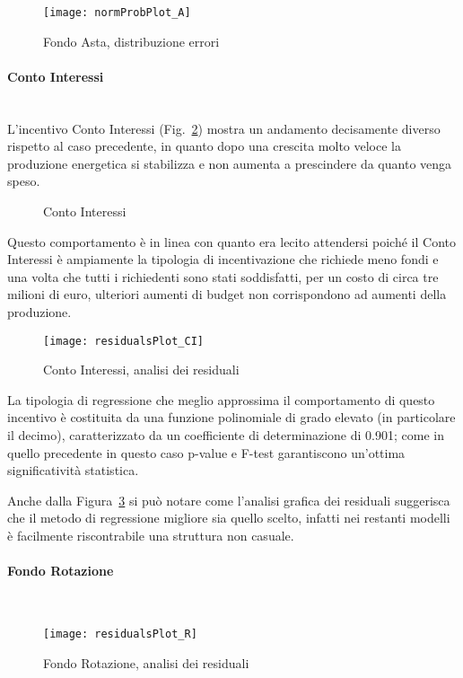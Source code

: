 \documentclass[12pt,a4paper,openright,twoside]{report}
\newcommand{\myparagraph}[1]{\paragraph{#1}\mbox{}\\}
\begin{document}
\begin{figure}[H]
	\centering
	\texttt{[image: normProbPlot\_A]}
	\caption{Fondo Asta, distribuzione errori}
	\label{normProbPlot_A}
\end{figure}

\myparagraph{Conto Interessi}

L'incentivo Conto Interessi (Fig.~\ref{graphSimCI}) mostra un andamento decisamente diverso rispetto al caso precedente, in quanto dopo una crescita molto veloce la produzione energetica si stabilizza e non aumenta a prescindere da quanto venga speso. 


\begin{figure}[H]
	\centering
	\qquad
	\caption{Conto Interessi}
	\label{graphSimCI}
\end{figure}

Questo comportamento è in linea con quanto era lecito attendersi poiché il Conto Interessi è ampiamente la tipologia di incentivazione che richiede meno fondi e una volta che tutti i richiedenti sono stati soddisfatti, per un costo di circa tre milioni di euro, ulteriori aumenti di budget non corrispondono ad aumenti della produzione.

\begin{figure}[hbt]
	\centering
	\texttt{[image: residualsPlot\_CI]}
	\caption{Conto Interessi, analisi dei residuali}
	\label{residualsPlot_CI}
\end{figure}

La tipologia di regressione che meglio approssima il comportamento di questo incentivo è costituita da una funzione polinomiale di grado elevato (in particolare il decimo), caratterizzato da un coefficiente di determinazione di 0.901; come in quello precedente in questo caso p-value e F-test garantiscono un'ottima significatività statistica.

Anche dalla Figura~\ref{residualsPlot_CI} si può notare come l'analisi grafica dei residuali suggerisca che il metodo di regressione migliore sia quello scelto, infatti nei restanti modelli è facilmente riscontrabile una struttura non casuale.

\myparagraph{Fondo Rotazione}

\begin{figure}[hbt]
	\centering
	\texttt{[image: residualsPlot\_R]}
	\caption{Fondo Rotazione, analisi dei residuali}
	\label{residualsPlot_R}
\end{figure}
\end{document}
